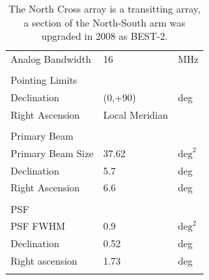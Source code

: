 \documentclass[useAMS,usenatbib,onecolumn]{mn2e}
\begin{document}
\begin{table}
\begin{center}
\begin{tabular}{| l | l | l |}
Analog Bandwidth &         16 &        MHz \\
        &            &            \\
\hline
Pointing Limits &            &            \\
\hline
Declination &    (0,+90) &        deg \\
Right Ascension &    Local Meridian &  \\
           &            &            \\
\hline
Primary Beam &          &           \\
\hline
Primary Beam Size &      37.62 &      $\textrm{deg}^2$ \\
Declination &        5.7 &        deg \\
Right Ascension &        6.6 &        deg \\
           &            &            \\
\hline
PSF    &       &       \\
\hline
PSF FWHM &        0.9 &      $\textrm{deg}^2$ \\
Declination &       0.52 &     deg \\
Right ascension &        1.73 &     deg \\
           &            &            \\
\hline
\end{tabular}
\caption{The North Cross array is a transitting array, a section of the North-South arm was upgraded in 2008 as BEST-2.}
\label{tbl:best2}
\end{center}
\end{table}
\end{document}
